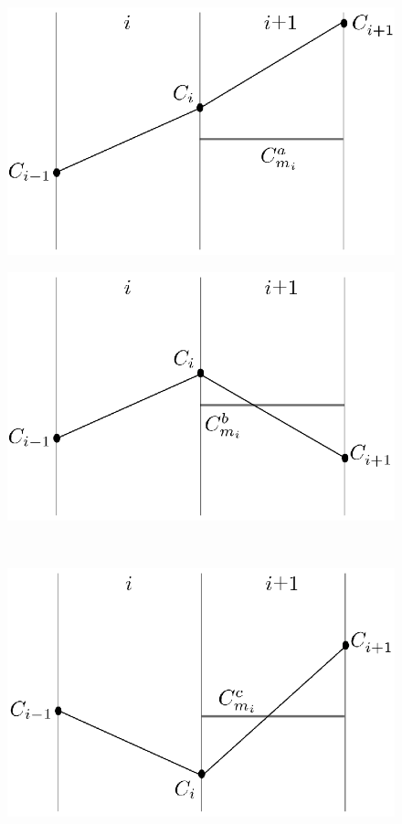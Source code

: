 \documentclass{tewiart}
\begin{document}
\begin{figure}[h]
\centering
\begin{minipage}{.49\linewidth}
\centering \includegraphics[width=\textwidth]{rysunek2a.eps}
\label{jedno}
\end{minipage}
\begin{minipage}{.49\linewidth}
\centering \includegraphics[width=\textwidth]{rysunek2b.eps}
\label{dwu}
\end{minipage}
\\
\begin{minipage}{.49\linewidth}
\centering \includegraphics[width=\textwidth]{rysunek2c.eps}

\end{minipage}
\end{figure}
\end{document}
